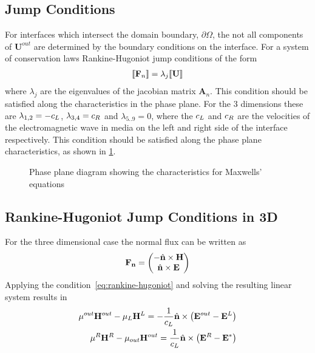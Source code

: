 \subsection{Jump Conditions}
For interfaces which intersect the domain boundary, $\partial \Omega$, the not all components of $\mathbf{U}^{out}$ are determined by the boundary conditions on the interface. For a system of conservation laws Rankine-Hugoniot jump conditions of the form
\begin{align}
\llbracket  \mathbf{F}_n  \rrbracket = \lambda_j \llbracket  \mathbf{U}  \rrbracket \label{eq:rankine-hugoniot}
\end{align}
where $\lambda_j$ are the eigenvalues of the jacobian matrix $\mathbf{A}_n$.
This condition should be satisfied along the characteristics in the phase plane.
For the 3 dimensions these are $ \lambda_{ 1,2 } = - c_{L} $, $
\lambda_{ 3,4 } = c_{R} $ and $\lambda_{5..9} = 0 $, where the
$c_{L}$ and $c_{R}$ are the velocities of the
electromagnetic wave in media on the left and right side of the interface
respectively. This condition should be satisfied along the phase plane
characteristics, as shown in \ref{fig:phase-plane-characteristics}.

\begin{figure}[h]
  \centering
  
  \caption{Phase plane diagram showing the characteristics for Maxwells' equations}
  \label{fig:phase-plane-characteristics}
\end{figure}

\subsection{Rankine-Hugoniot Jump Conditions in 3D}
For the three dimensional case the normal flux can be written as
\begin{align*}
\mathbf{\mathbf{F}_n} =
\begin{pmatrix}
- \hat{\mathbf{n}} \times \mathbf{H} \\
\hat{\mathbf{n}} \times \mathbf{E}
\end{pmatrix}
\end{align*}
Applying the condition~\eqref{eq:rankine-hugoniot} and solving the resulting linear system results in
\begin{align}
  \mu^{out} \mathbf{H}^{out} - \mu_L \mathbf{H}^{L} = - \frac{1}{c_{L}} \hat{\mathbf{n}} \times \left( \mathbf{E}^{out} - \mathbf{E}^{L} \right)
  \label{eq:jump-condition-resulting-equation-system-3D-1} \\
  \mu^{R} \mathbf{H}^{R} - \mu_{out} \mathbf{H}^{out} = \frac{1}{c_{L}} \hat{\mathbf{n}} \times \left( \mathbf{E}^{R} - \mathbf{E}^{*} \right)
  \label{eq:jump-condition-resulting-equation-system-3D-2} \\
\end{align}
